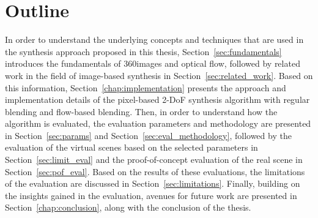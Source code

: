 

\section*{Outline}
In order to understand the underlying concepts and techniques that are used in the synthesis approach proposed in this thesis, Section~\ref{sec:fundamentals} introduces the fundamentals of 360\degree images and optical flow, followed by related work in the field of image-based synthesis in Section~\ref{sec:related_work}.
Based on this information, Section~\ref{chap:implementation} presents the approach and implementation details of the pixel-based 2-DoF synthesis algorithm with regular blending and flow-based blending.
Then, in order to understand how the algorithm is evaluated, the evaluation parameters and methodology are presented in Section~\ref{sec:params} and Section~\ref{sec:eval_methodology}, followed by the evaluation of the virtual scenes based on the selected parameters in Section~\ref{sec:limit_eval} and the proof-of-concept evaluation of the real scene in Section~\ref{sec:pof_eval}. Based on the results of these evaluations, the limitations of the evaluation are discussed in Section~\ref{sec:limitations}.
Finally, building on the insights gained in the evaluation, avenues for future work are presented in Section~\ref{chap:conclusion}, along with the conclusion of the thesis.


